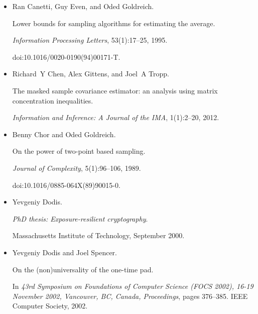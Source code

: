 \documentclass[10pt,a4paper]{article}
\begin{document}
\begin{itemize}
doi:10.1007/3-540-45539-6\_33.





\item[] 
[10]

Ran Canetti, Guy Even, and Oded Goldreich.


Lower bounds for sampling algorithms for estimating the average.


\emph{Information Processing Letters}, 53(1):17–25, 1995.


doi:10.1016/0020-0190(94)00171-T.





\item[] 
[11]

Richard Y Chen, Alex Gittens, and Joel A Tropp.


The masked sample covariance estimator: an analysis using matrix
concentration inequalities.


\emph{Information and Inference: A Journal of the IMA}, 1(1):2–20,
2012.





\item[] 
[12]

Benny Chor and Oded Goldreich.


On the power of two-point based sampling.


\emph{Journal of Complexity}, 5(1):96–106, 1989.


doi:10.1016/0885-064X(89)90015-0.





\item[] 
[13]

Yevgeniy Dodis.


\emph{PhD thesis: Exposure-resilient cryptography}.


Massachusetts Institute of Technology, September 2000.





\item[] 
[14]

Yevgeniy Dodis and Joel Spencer.


On the (non)universality of the one-time pad.


In \emph{43rd Symposium on Foundations of Computer Science (FOCS
2002), 16-19 November 2002, Vancouver, BC, Canada, Proceedings}, pages
376–385. IEEE Computer Society, 2002.






\end{itemize}
\end{document}
